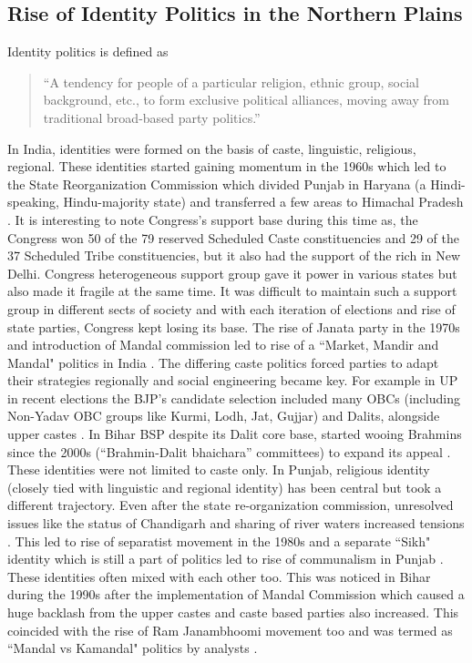 \begin{sloppypar}
\subsection{Rise of Identity Politics in the Northern Plains}
Identity politics is defined as \begin{quote}
     ``A tendency for people of a particular religion, ethnic group, social background, etc., to form exclusive political alliances, moving away from traditional broad-based party politics.''
 \end{quote}  \citep{oed2024}
In India, identities were formed on the basis of caste, linguistic, religious, regional. These identities started gaining momentum in the 1960s which led to the State Reorganization Commission which divided Punjab in Haryana (a Hindi-speaking, Hindu-majority state) and transferred a few areas to Himachal Pradesh \citep{Punjab_1966_reorg}. It is interesting to note Congress's support base during this time as, the Congress won 50 of the 79 reserved Scheduled Caste constituencies and 29 of the 37 Scheduled Tribe constituencies, but it also had the support of the rich in New Delhi. Congress heterogeneous support group gave it power in various states but also made it fragile at the same time. It was difficult to maintain such a support group in different sects of society and with each iteration of elections and rise of state parties, Congress kept losing its base. The rise of Janata party in the 1970s and introduction of Mandal commission led to rise of a ``Market, Mandir and Mandal" politics in India \citep{yadav1999electoral}. The differing caste politics forced parties to adapt their strategies regionally and social engineering became key. For example in UP in recent elections the BJP’s candidate selection  included many OBCs (including Non-Yadav OBC groups like Kurmi, Lodh, Jat, Gujjar) and Dalits, alongside upper castes \citep{jaffrelot2012castes}. In Bihar BSP despite its Dalit core base, started wooing Brahmins since the 2000s (“Brahmin-Dalit bhaichara” committees) to expand its appeal \citep{ankit2018caste}. These identities were not limited to caste only. In Punjab, religious identity (closely tied with linguistic and regional identity) has been central but took a different trajectory. Even after the state re-organization commission,  unresolved issues like the status of Chandigarh and sharing of river waters increased tensions \citep{padhiari2008inter}. This led to rise of separatist movement in the 1980s and a separate ``Sikh" identity which is still a part of politics led to rise of communalism in Punjab \citep{gupta1985communalising}. These identities often mixed with each other too. This was noticed in Bihar during the 1990s after the implementation of Mandal Commission which caused a huge backlash from the upper castes and caste based parties also increased. This coincided with the rise of Ram Janambhoomi movement too and was termed as ``Mandal vs Kamandal" politics by analysts \citep{roy2024politics}. 


\end{sloppypar}
